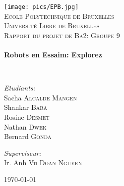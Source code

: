 \begin{titlepage}
\begin{center}

\texttt{[image: pics/EPB.jpg]}~\\[1cm]

\textsc{\LARGE Ecole Polytechnique de Bruxelles\\Université Libre de Bruxelles}\\[1.5cm]

\textsc{\Large Rapport du projet de Ba2: Groupe 9}\\[0.5cm]

\HRule \\[0.4cm]
{ \huge \bfseries Robots en Essaim: Explorez\\[0.4cm] }

\HRule \\[1.5cm]

\begin{minipage}{0.49\textwidth}
\begin{flushleft} \large
\emph{Etudiants:}\\
Sacha \textsc{Alcalde Mangen}\\
Shankar \textsc{Baba}\\
Rosine \textsc{Desmet}\\
Nathan \textsc{Dwek}\\
Bernard \textsc{Gonda}\\
\end{flushleft}
\end{minipage}
\begin{minipage}{0.49\textwidth}
\begin{flushright} \large
\emph{Superviseur:} \\
Ir. Anh Vu \textsc{Doan Nguyen}
\end{flushright}
\end{minipage}

\vfill

{\large \today}

\end{center}
\end{titlepage}

